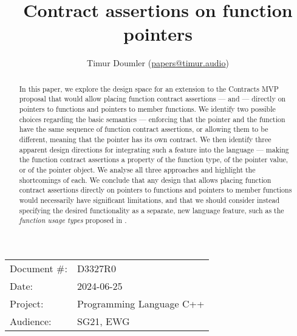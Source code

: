

 \usepackage[bottom]{footmisc} 

 \usepackage{longtable}


\usepackage{tikz,lipsum,lmodern}
\usepackage[most]{tcolorbox}



\usepackage{titlesec}
\usepackage{tocloft}


\newcommand{\changelocaltocdepth}[1]{%
  \addtocontents{toc}{\protect\setcounter{tocdepth}{#1}}%
  \setcounter{tocdepth}{#1}%
}

\setcounter{tocdepth}{3}



\title{Contract assertions on function pointers}
\author{ Timur Doumler \small(\href{mailto:papers@timur.audio}{papers@timur.audio}) 
}
\date{}
\maketitle

\begin{tabular}{ll}
Document \#: & D3327R0 \\
Date: &2024-06-25 \\
Project: & Programming Language C++ \\
Audience: & SG21, EWG
\end{tabular}

\begin{abstract}
In this paper, we explore the design space for an extension to the Contracts MVP proposal \cite{P2900R7} that would allow placing function contract assertions ---  and  --- directly on pointers to functions and pointers to member functions. We identify two possible choices regarding the basic semantics --- enforcing that the pointer and the function have the same sequence of function contract assertions, or allowing them to be different, meaning that the pointer has its own contract. We then identify three apparent design directions for integrating such a feature into the language --- making the function contract assertions a property of the function type, of the pointer value, or of the pointer object. We analyse all three approaches and highlight the shortcomings of each. We conclude that any design that allows placing function contract assertions directly on pointers to functions and pointers to member functions would necessarily have significant limitations, and that we should consider instead specifying the desired functionality as a separate, new language feature, such as the \emph{function usage types} proposed in \cite{P3271R0}.
\end{abstract}

